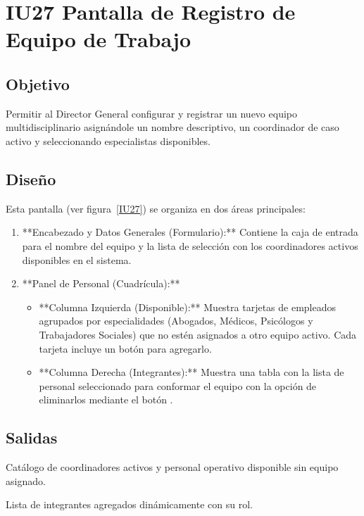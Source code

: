 \section{IU27 Pantalla de Registro de Equipo de Trabajo}

\subsection{Objetivo}
	Permitir al Director General configurar y registrar un nuevo equipo multidisciplinario asignándole un nombre descriptivo, un coordinador de caso activo y seleccionando especialistas disponibles.

\subsection{Diseño}
	Esta pantalla  (ver figura~\ref{IU27}) se organiza en dos áreas principales:
	\begin{enumerate}
		\item **Encabezado y Datos Generales (Formulario):** Contiene la caja de entrada para el nombre del equipo y la lista de selección con los coordinadores activos disponibles en el sistema.
		\item **Panel de Personal (Cuadrícula):**
			\begin{itemize}
				\item **Columna Izquierda (Disponible):** Muestra tarjetas de empleados agrupados por especialidades (Abogados, Médicos, Psicólogos y Trabajadores Sociales) que no estén asignados a otro equipo activo. Cada tarjeta incluye un botón \IUbutton{+} para agregarlo.
				\item **Columna Derecha (Integrantes):** Muestra una tabla con la lista de personal seleccionado para conformar el equipo con la opción de eliminarlos mediante el botón .
			\end{itemize}
	\end{enumerate}


\subsection{Salidas}
	\begin{Citemize}
		\item Catálogo de coordinadores activos y personal operativo disponible sin equipo asignado.
		\item Lista de integrantes agregados dinámicamente con su rol.
	\end{Citemize}

